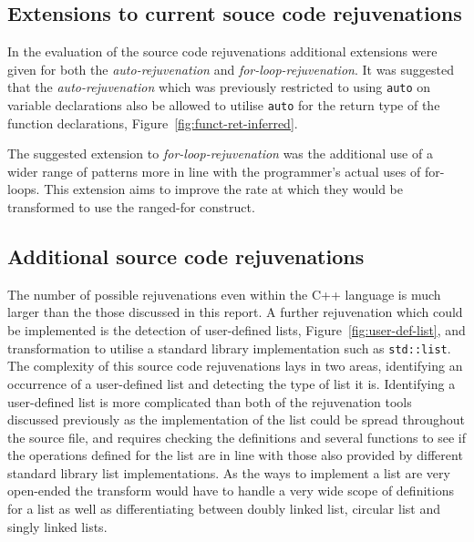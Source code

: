 \documentclass[bsc,frontabs,singlespacing,twoside,parskip,deptreport]{infthesis}
\begin{document}
\subsection{Extensions to current souce code rejuvenations}
In the evaluation of the source code rejuvenations additional extensions were given for both the \textit{auto-rejuvenation} and  \textit{for-loop-rejuvenation}. It was suggested that the \textit{auto-rejuvenation} which was previously restricted to using \texttt{auto} on variable declarations also be allowed to utilise \texttt{auto} for the return type of the function declarations, Figure~\ref{fig:funct-ret-inferred}.

The suggested extension to \textit{for-loop-rejuvenation} was the additional use of a wider range of patterns more in line with the programmer's actual uses of for-loops. This extension aims to improve the rate at which they would be transformed to use the ranged-for construct.



\subsection{Additional source code rejuvenations}
The number of possible rejuvenations even within the C++ language is much larger than the those discussed in this report. A further rejuvenation which could be implemented is the detection of user-defined lists, Figure~\ref{fig:user-def-list}, and transformation to utilise a standard library implementation such as \texttt{std::list}. The complexity of this source code rejuvenations lays in two areas, identifying an occurrence of a user-defined list and detecting the type of list it is. Identifying a user-defined list is more complicated than both of the rejuvenation tools discussed previously as the implementation of the list could be spread throughout the source file, and requires checking the definitions and several functions to see if the operations defined for the list are in line with those also provided by different standard library list implementations. As the ways to implement a list are very open-ended the transform would have to handle a very wide scope of definitions for a list as well as differentiating between doubly linked list, circular list and singly linked lists.
\end{document}
